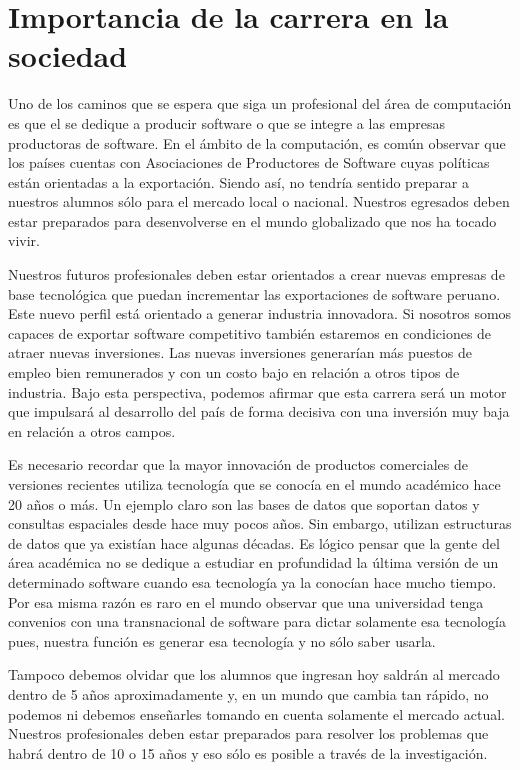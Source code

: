 \section{Importancia de la carrera en la sociedad}\label{sec:importance-in-the-society}
Uno de los caminos que se espera que siga un profesional del área de computación es 
que el se dedique a producir software o que se integre a las empresas productoras 
de software. En el ámbito de la computación, es común observar que los países 
cuentas con Asociaciones de Productores de Software cuyas políticas están 
orientadas a la exportación. Siendo así, no tendría sentido preparar a nuestros 
alumnos sólo para el mercado local o nacional. Nuestros egresados deben estar 
preparados para desenvolverse en el mundo globalizado que nos ha tocado vivir.

Nuestros futuros profesionales deben estar orientados a crear nuevas empresas 
de base tecnológica que puedan incrementar las exportaciones de software peruano. 
Este nuevo perfil está orientado a generar industria innovadora. Si nosotros somos 
capaces de exportar software competitivo también estaremos en condiciones de 
atraer nuevas inversiones. Las nuevas inversiones generarían más puestos de 
empleo bien remunerados y con un costo bajo en relación a otros tipos de 
industria. Bajo esta perspectiva, podemos afirmar que esta carrera será un 
motor que impulsará al desarrollo del país de forma decisiva con una inversión 
muy baja en relación a otros campos.

Es necesario recordar que la mayor innovación de productos comerciales de versiones 
recientes utiliza tecnología que se conocía en el mundo académico hace 20 años o más. 
Un ejemplo claro son las bases de datos que soportan datos y consultas espaciales 
desde hace muy pocos años. Sin embargo, utilizan estructuras de datos que ya 
existían hace algunas décadas. Es lógico pensar que la gente del área académica 
no se dedique a estudiar en profundidad la última versión de un determinado 
software cuando esa tecnología ya la conocían hace mucho tiempo. Por esa misma 
razón es raro en el mundo observar que una universidad tenga convenios con una 
transnacional de software para dictar solamente esa tecnología pues, nuestra 
función es generar esa tecnología y no sólo saber usarla.

Tampoco debemos olvidar que los alumnos que ingresan hoy saldrán al mercado 
dentro de 5 años aproximadamente y, en un mundo que cambia tan rápido, no podemos 
ni debemos enseñarles tomando en cuenta solamente el mercado actual. 
Nuestros profesionales deben estar preparados para resolver los problemas 
que habrá dentro de 10 o 15 años y eso sólo es posible a través de la 
investigación.
